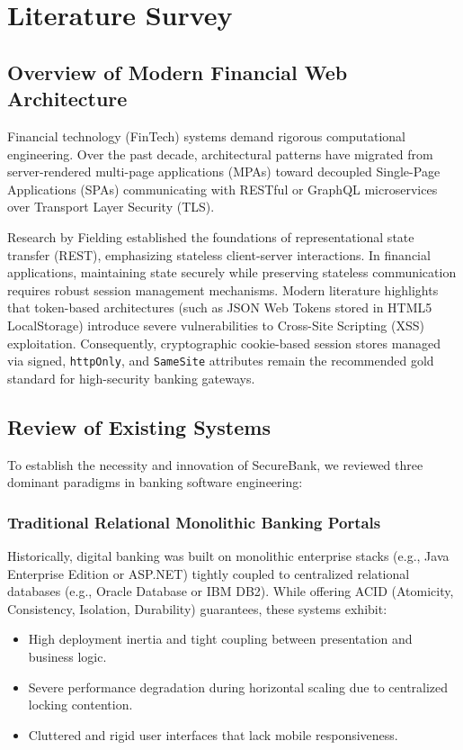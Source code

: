 \chapter{Literature Survey}

\section{Overview of Modern Financial Web Architecture}
Financial technology (FinTech) systems demand rigorous computational engineering. Over the past decade, architectural patterns have migrated from server-rendered multi-page applications (MPAs) toward decoupled Single-Page Applications (SPAs) communicating with RESTful or GraphQL microservices over Transport Layer Security (TLS). 

Research by Fielding \cite{fielding2000architectural} established the foundations of representational state transfer (REST), emphasizing stateless client-server interactions. In financial applications, maintaining state securely while preserving stateless communication requires robust session management mechanisms. Modern literature \cite{owasp2021top} highlights that token-based architectures (such as JSON Web Tokens stored in HTML5 LocalStorage) introduce severe vulnerabilities to Cross-Site Scripting (XSS) exploitation. Consequently, cryptographic cookie-based session stores managed via signed, \texttt{httpOnly}, and \texttt{SameSite} attributes remain the recommended gold standard for high-security banking gateways.

\section{Review of Existing Systems}
To establish the necessity and innovation of SecureBank, we reviewed three dominant paradigms in banking software engineering:

\subsection{Traditional Relational Monolithic Banking Portals}
Historically, digital banking was built on monolithic enterprise stacks (e.g., Java Enterprise Edition or ASP.NET) tightly coupled to centralized relational databases (e.g., Oracle Database or IBM DB2). While offering ACID (Atomicity, Consistency, Isolation, Durability) guarantees, these systems exhibit:
\begin{itemize}
    \item High deployment inertia and tight coupling between presentation and business logic.
    \item Severe performance degradation during horizontal scaling due to centralized locking contention.
    \item Cluttered and rigid user interfaces that lack mobile responsiveness.
\end{itemize}

